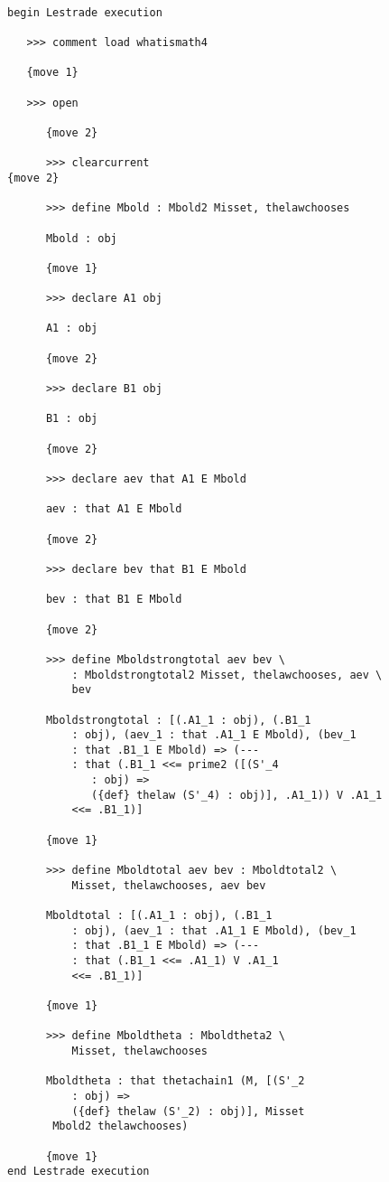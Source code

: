 \documentclass[12pt]{article}
\begin{document}
\begin{verbatim}

begin Lestrade execution

   >>> comment load whatismath4

   {move 1}

   >>> open

      {move 2}

      >>> clearcurrent
{move 2}

      >>> define Mbold : Mbold2 Misset, thelawchooses

      Mbold : obj

      {move 1}

      >>> declare A1 obj

      A1 : obj

      {move 2}

      >>> declare B1 obj

      B1 : obj

      {move 2}

      >>> declare aev that A1 E Mbold

      aev : that A1 E Mbold

      {move 2}

      >>> declare bev that B1 E Mbold

      bev : that B1 E Mbold

      {move 2}

      >>> define Mboldstrongtotal aev bev \
          : Mboldstrongtotal2 Misset, thelawchooses, aev \
          bev

      Mboldstrongtotal : [(.A1_1 : obj), (.B1_1 
          : obj), (aev_1 : that .A1_1 E Mbold), (bev_1 
          : that .B1_1 E Mbold) => (--- 
          : that (.B1_1 <<= prime2 ([(S'_4 
             : obj) => 
             ({def} thelaw (S'_4) : obj)], .A1_1)) V .A1_1 
          <<= .B1_1)]

      {move 1}

      >>> define Mboldtotal aev bev : Mboldtotal2 \
          Misset, thelawchooses, aev bev

      Mboldtotal : [(.A1_1 : obj), (.B1_1 
          : obj), (aev_1 : that .A1_1 E Mbold), (bev_1 
          : that .B1_1 E Mbold) => (--- 
          : that (.B1_1 <<= .A1_1) V .A1_1 
          <<= .B1_1)]

      {move 1}

      >>> define Mboldtheta : Mboldtheta2 \
          Misset, thelawchooses

      Mboldtheta : that thetachain1 (M, [(S'_2 
          : obj) => 
          ({def} thelaw (S'_2) : obj)], Misset 
       Mbold2 thelawchooses)

      {move 1}
end Lestrade execution
\end{verbatim}
\end{document}
